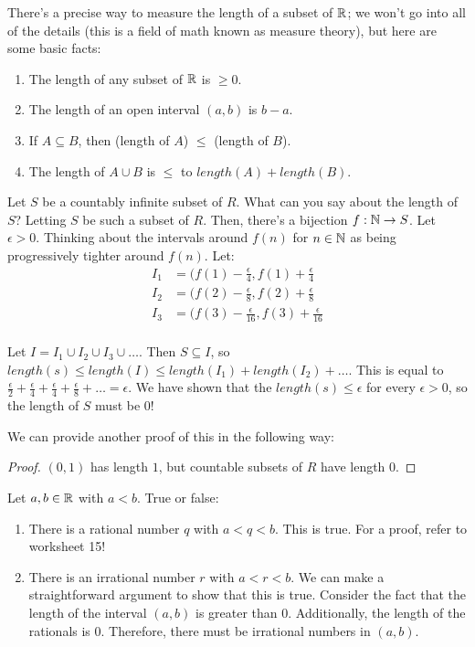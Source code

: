 \begin{example}
There's a precise way to measure the length of a subset of $\mathbb{R}$; we won't go into all of the details (this is a field of math known as measure theory), but here are some basic facts:
\begin{enumerate}
    \item The length of any subset of $\mathbb{R}$ is $\geq 0$.
    \item The length of an open interval $(a, b)$ is $b-a$.
    \item If $A \subseteq B$, then (length of $A$) $\leq$ (length of $B$).
    \item The length of $A \cup B$ is $\leq$ to $length(A) + length(B)$.
\end{enumerate}
Let $S$ be a countably infinite subset of $R$. What can you say about the length of $S$? Letting $S$ be such a subset of $R$. Then, there's a bijection $f: \mathbb{N} \to S$. Let $\epsilon > 0$. Thinking about the intervals around $f(n)$ for $n \in \mathbb{N}$ as being progressively tighter around $f(n)$. Let:
\begin{align*}
    I_1 &= (f(1) - \frac \epsilon 4, f(1) + \frac \epsilon 4 \\
    I_2 &= (f(2) - \frac \epsilon 8, f(2) + \frac \epsilon 8 \\
    I_3 &= (f(3) - \frac \epsilon {16}, f(3) + \frac \epsilon {16} \\
\end{align*}

Let $I = I_1 \cup I_2 \cup I_3 \cup \dots$. Then $S \subseteq I$, so $length(s) \leq length(I) \leq length(I_1) + length(I_2) + \dots$. This is equal to $\frac{\epsilon}{2} + \frac{\epsilon}{4} + \frac{\epsilon}{4} + \frac{\epsilon}{8} + \dots = \epsilon$. We have shown that the $length(s) \leq \epsilon$ for every $\epsilon > 0$, so the length of $S$ must be $0$!



We can provide another proof of this in the following way:
\begin{proof}
$(0,1)$ has length $1$, but countable subsets of $R$ have length $0$.
\end{proof}
\end{example}

\begin{example}
Let $a,b \in \mathbb{R}$ with $a<b$. True or false:
\begin{enumerate}
    \item There is a rational number $q$ with $a < q < b$.
    This is true. For a proof, refer to worksheet 15!
    \item There is an irrational number $r$ with $a < r < b$. 
    We can make a straightforward argument to show that this is true. Consider the fact that the length of the interval $(a,b)$ is greater than $0$. Additionally, the length of the rationals is $0$. Therefore, there must be irrational numbers in $(a, b)$.
\end{enumerate}
\end{example}

